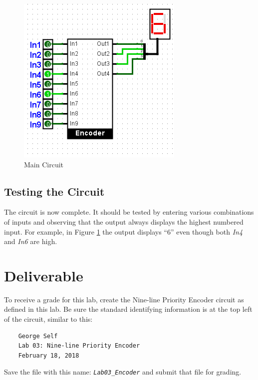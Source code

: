 \begin{figure}[H]
	\centering
	\includegraphics[width=\maxwidth{.95\linewidth}]{gfx/03-06}
	\caption{Main Circuit}
	\label{fig:03-06}
\end{figure}


\subsection{Testing the Circuit}

The circuit is now complete. It should be tested by entering various combinations of inputs and observing that the output always displays the highest numbered input. For example, in Figure \ref{fig:03-06} the output displays ``6'' even though both \textit{In4} and \textit{In6} are high.

\section{Deliverable}

To receive a grade for this lab, create the Nine-line Priority Encoder circuit as defined in this lab. Be sure the standard identifying information is at the top left of the circuit, similar to this:

\bigskip
\begin{minipage}{\linewidth}
	\begin{verbatim}
	George Self
	Lab 03: Nine-line Priority Encoder
	February 18, 2018
	\end{verbatim}
\end{minipage}
\bigskip

Save the file with this name: \emph{\texttt{Lab03\_Encoder}} and submit that file for grading.